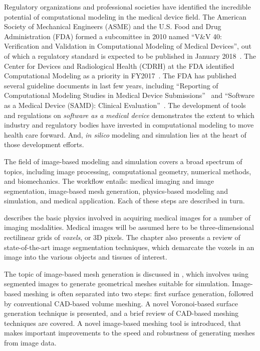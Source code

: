 
Regulatory organizations and professional societies have identified the incredible potential of computational modeling in the medical device field. The American Society of Mechanical Engineers (ASME) and the U.S. Food and Drug Administration (FDA) formed a subcomittee in 2010 named ``V\&V 40: Verification and Validation in Computational Modeling of Medical Devices'', out of which a regulatory standard is expected to be published in January 2018~\cite{committee}. The Center for Devices and Radiological Health (CDRH) at the FDA identified Computational Modeling as a priority in FY2017~\cite{Morrison2017}. The FDA has published several guideline documents in last few years, including ``Reporting of Computational Modeling Studies in Medical Device Submissions''~\cite{fda1_2016} and ``Software as a Medical Device (SAMD): Clinical Evaluation''~\cite{fda1_2016}. The development of tools and regulations on \textit{software as a medical device} demonstrates the extent to which industry and regulatory bodies have invested in computational modeling to move health care forward. And, \textit{in silico} modeling and simulation lies at the heart of those development efforts.


The field of image-based modeling and simulation covers a broad spectrum of topics, including image processing, computational geometry, numerical methods, and biomechanics. The workflow entails: medical imaging and image segmentation, image-based mesh generation, physics-based modeling and simulation, and medical application. Each of these steps are described in turn.

 describes the basic physics involved in acquiring medical images for a number of imaging modalities. Medical images will be assumed here to be three-dimensional rectilinear grids of \textit{voxels}, or 3D pixels. The chapter also presents a review of state-of-the-art image segmentation techniques, which demarcate the voxels in an image into the various objects and tissues of interest.

The topic of image-based mesh generation is discussed in , which involves using segmented images to generate  geometrical meshes suitable for simulation. Image-based meshing is often separated into two steps: first surface generation,  followed by conventional CAD-based volume meshing. A novel Voronoi-based surface generation technique is presented, and a brief review of CAD-based meshing techniques are covered. A novel image-based meshing tool is introduced, that makes important improvements to the speed and robustness of generating meshes from image data.

